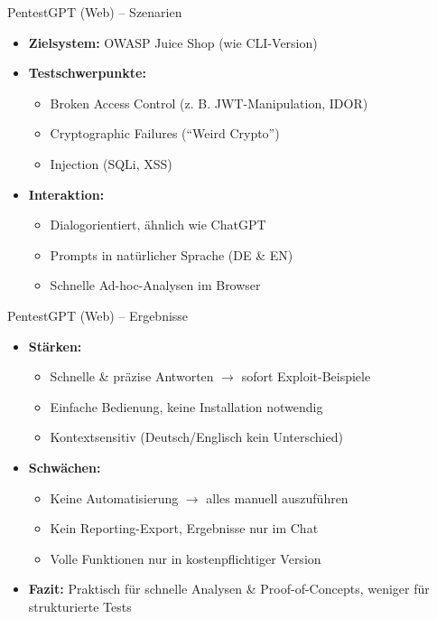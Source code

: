 \documentclass[
	aspectratio=169,	%
	onlytextwidth,		%
	t,					%
	]{beamer}
\begin{document}
\begin{frame}{PentestGPT (Web) – Szenarien}
	\begin{itemize}
		\item \textbf{Zielsystem:} OWASP Juice Shop (wie CLI-Version)
		
		\item \textbf{Testschwerpunkte:}
		\begin{itemize}
			\item Broken Access Control (z. B. JWT-Manipulation, IDOR)
			\item Cryptographic Failures (\enquote{Weird Crypto})
			\item Injection (SQLi, XSS)
		\end{itemize}
		
		\item \textbf{Interaktion:}
		\begin{itemize}
			\item Dialogorientiert, ähnlich wie ChatGPT
			\item Prompts in natürlicher Sprache (DE \& EN)
			\item Schnelle Ad-hoc-Analysen im Browser
		\end{itemize}
	\end{itemize}

\end{frame}

\begin{frame}{PentestGPT (Web) – Ergebnisse}
	\begin{itemize}
		\item \textbf{Stärken:}
		\begin{itemize}
			\item Schnelle \& präzise Antworten $\rightarrow$ sofort Exploit-Beispiele
			\item Einfache Bedienung, keine Installation notwendig
			\item Kontextsensitiv (Deutsch/Englisch kein Unterschied)
		\end{itemize}
		
		\item \textbf{Schwächen:}
		\begin{itemize}
			\item Keine Automatisierung $\rightarrow$ alles manuell auszuführen
			\item Kein Reporting-Export, Ergebnisse nur im Chat
			\item Volle Funktionen nur in kostenpflichtiger Version
		\end{itemize}
		
		\item \textbf{Fazit:}  
		Praktisch für schnelle Analysen \& Proof-of-Concepts, weniger für strukturierte Tests
	\end{itemize}
\end{frame}
\end{document}
